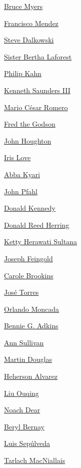 \protect\hyperlink{bruce-myers}{Bruce Myers}

\protect\hyperlink{francisco-mendez}{Francisco Mendez}

\protect\hyperlink{steve-dalkowski}{Steve Dalkowski}

\protect\hyperlink{sister-bertha-laforest}{Sister Bertha Laforest}

\protect\hyperlink{philip-kahn}{Philip Kahn}

\protect\hyperlink{kenneth-saunders-iii}{Kenneth Saunders III}

\protect\hyperlink{mario-cuxe9sar-romero}{Mario César Romero}

\protect\hyperlink{fred-the-godson}{Fred the Godson}

\protect\hyperlink{john-houghton}{John Houghton}

\protect\hyperlink{iris-love}{Iris Love}

\protect\hyperlink{abba-kyari}{Abba Kyari}

\protect\hyperlink{john-pfahl}{John Pfahl}

\protect\hyperlink{donald-kennedy}{Donald Kennedy}

\protect\hyperlink{donald-reed-herring}{Donald Reed Herring}

\protect\hyperlink{ketty-herawati-sultana}{Ketty Herawati Sultana}

\protect\hyperlink{joseph-feingold}{Joseph Feingold}

\protect\hyperlink{carole-brookins}{Carole Brookins}

\protect\hyperlink{josuxe9-torres}{José Torres}

\protect\hyperlink{orlando-moncada}{Orlando Moncada}

\protect\hyperlink{bennie-g-adkins}{Bennie G. Adkins}

\protect\hyperlink{ann-sullivan}{Ann Sullivan}

\protect\hyperlink{martin-douglas}{Martin Douglas}

\protect\hyperlink{heherson-alvarez}{Heherson Alvarez}

\protect\hyperlink{liu-ouqing}{Liu Ouqing}

\protect\hyperlink{noach-dear}{Noach Dear}

\protect\hyperlink{beryl-bernay}{Beryl Bernay}

\protect\hyperlink{luis-sepuxfalveda}{Luis Sepúlveda}

\protect\hyperlink{tarlach-macniallais}{Tarlach MacNiallais}


